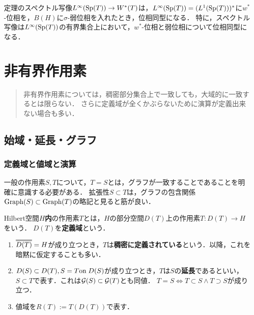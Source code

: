 \documentclass[uplatex,dvipdfmx]{jsreport}
\begin{document}
\begin{proposition}
    定理のスペクトル写像$L^\infty(\mathrm{Sp}(T))\to W^*(T)$は，$L^\infty(\mathrm{Sp}(T))=(L^1(\mathrm{Sp}(T)))^*$に$w^*$-位相を，$B(H)$に$\sigma$-弱位相を入れたとき，位相同型になる．
    特に，スペクトル写像は$L^\infty(\mathrm{Sp}(T))$の有界集合上において，$w^*$-位相と弱位相について位相同型になる．
\end{proposition}

\chapter{非有界作用素}

\begin{quotation}
    非有界作用素については，稠密部分集合上で一致しても，大域的に一致するとは限らない．
    さらに定義域が全くかぶらないために演算が定義出来ない場合も多い．
\end{quotation}

\section{始域・延長・グラフ}  

\subsection{定義域と値域と演算}

\begin{tcolorbox}[colframe=ForestGreen, colback=ForestGreen!10!white,breakable,colbacktitle=ForestGreen!40!white,coltitle=black,fonttitle=\bfseries\sffamily,
title=]
    一般の作用素$S,T$について，$T=S$とは，グラフが一致することであることを明確に意識する必要がある．
    拡張性$S\subset T$は，グラフの包含関係$\mathrm{Graph}(S)\subset\mathrm{Graph}(T)$の略記と見ると筋が良い．
\end{tcolorbox}

\begin{definition}
    Hilbert空間$H$\textbf{内}の作用素$T$とは，$H$の部分空間$D(T)$上の作用素$T:D(T)\to H$をいう．
    $D(T)$を\textbf{定義域}という．
    \begin{enumerate}
        \item $\oo{D(T)}=H$が成り立つとき，$T$は\textbf{稠密に定義されている}という．以降，これを暗黙に仮定することも多い．
        \item $D(S)\subset D(T),S=T\mathrm{on}\; D(S)$が成り立つとき，$T$は$S$の\textbf{延長}であるといい，$S\subset T$で表す．これは$\mathcal{G}(S)\subset\mathcal{G}(T)$とも同値．
        $T=S\Leftrightarrow T\subset S\land T\supset S$が成り立つ．
        \item 値域を$R(T):=T(D(T))$で表す．
    \end{enumerate}
\end{definition}
\end{document}
